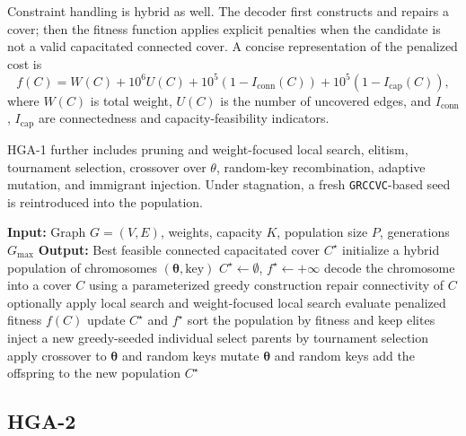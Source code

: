 \documentclass[11pt]{article}
\begin{document}
Constraint handling is hybrid as well. The decoder first constructs and repairs a cover; then the fitness function applies explicit penalties when the candidate is not a valid capacitated connected cover. A concise representation of the penalized cost is
\[
f(C)=W(C)+10^6U(C)+10^5(1-I_{\mathrm{conn}}(C))+10^5(1-I_{\mathrm{cap}}(C)),
\]
where \(W(C)\) is total weight, \(U(C)\) is the number of uncovered edges, and \(I_{\mathrm{conn}}\), \(I_{\mathrm{cap}}\) are connectedness and capacity-feasibility indicators.

HGA-1 further includes pruning and weight-focused local search, elitism, tournament selection, crossover over \(\theta\), random-key recombination, adaptive mutation, and immigrant injection. Under stagnation, a fresh \texttt{GRCCVC}-based seed is reintroduced into the population.

\begin{algorithm}[h]
\caption{HGA-1 / HGA-CCVC}
\begin{algorithmic}[1]
\State \textbf{Input:} Graph \(G=(V,E)\), weights, capacity \(K\), population size \(P\), generations \(G_{\max}\)
\State \textbf{Output:} Best feasible connected capacitated cover \(C^{\star}\)
\State initialize a hybrid population of chromosomes \((\boldsymbol{\theta},\mathrm{key})\)
\State \(C^{\star}\gets\emptyset\), \(f^{\star}\gets +\infty\)
        \State decode the chromosome into a cover \(C\) using a parameterized greedy construction
        \State repair connectivity of \(C\)
        \State optionally apply local search and weight-focused local search
        \State evaluate penalized fitness \(f(C)\)
            \State update \(C^{\star}\) and \(f^{\star}\)
        \EndIf
    \EndFor
    \State sort the population by fitness and keep elites
        \State inject a new greedy-seeded individual
    \EndIf
        \State select parents by tournament selection
        \State apply crossover to \(\boldsymbol{\theta}\) and random keys
        \State mutate \(\boldsymbol{\theta}\) and random keys
        \State add the offspring to the new population
    \EndWhile
\EndFor
\State \Return \(C^{\star}\)
\end{algorithmic}
\end{algorithm}

\subsection{HGA-2}
\end{document}
